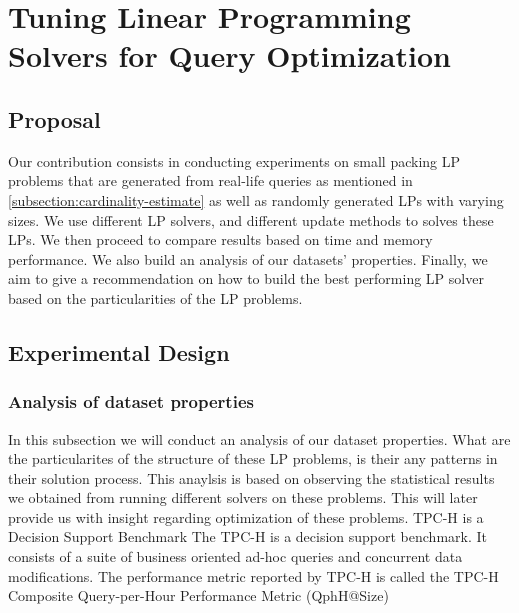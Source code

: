 
\chapter{Tuning Linear Programming Solvers for Query Optimization}\label{chapter:linearprogramming}

\section{Proposal}
Our contribution consists in conducting experiments on small packing LP problems that are generated from
real-life queries as mentioned in \ref{subsection:cardinality-estimate} as well as randomly generated
LPs with varying sizes. We use different LP solvers, and different update methods to solves these LPs.
We then proceed to compare results based on time and memory performance. We also build an analysis of our datasets' properties.
Finally, we aim to give a recommendation on how to build the best performing LP solver based on the 
particularities of the LP problems.
\section{Experimental Design}
\subsection{Analysis of dataset properties}
In  this subsection we will conduct an analysis of our dataset properties. What are the
particularites of the structure of these LP problems, is their any patterns in their solution
process. This anaylsis is based on observing the statistical results we obtained from
running different solvers on these problems. This will later provide us with insight
regarding optimization of these problems.
TPC-H is a Decision Support Benchmark
The TPC-H is a decision support benchmark. It consists
of a suite of business oriented ad-hoc queries and concurrent data modifications.
The performance metric reported by TPC-H is called the TPC-H Composite
Query-per-Hour Performance Metric (QphH@Size)


